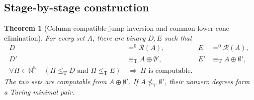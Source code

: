 \documentclass[11pt,a4paper]{article}
\newcommand{\N}{\mathbb N}
\newcommand{\Baire}{\N^{\N}}
\newcommand{\leT}{\leq_{\mathrm T}}
\newcommand{\eqT}{\equiv_{\mathrm T}}
\newcommand{\nleT}{\nleq_{\mathrm T}}
\newcommand{\az}{\mathrel{=^{0}}}
\newcommand{\R}{\mathcal R}
\newtheorem{theorem}{Theorem}[section]
\theoremstyle{definition}\newtheorem{definition}[theorem]{Definition}
\theoremstyle{remark}\newtheorem{remark}[theorem]{Remark}
\begin{document}
\subsection{Stage-by-stage construction}
\begin{theorem}[Column-compatible jump inversion and common-lower-cone elimination]\label{thm:pair}
For every set $A$, there are binary $D,E$ such that
\begin{align}
 D&\az\R(A),&E&\az\R(A),\label{eq:pair-density}\\
 D'&\eqT A\oplus\emptyset',&E'&\eqT A\oplus\emptyset',\label{eq:pair-jumps}\\
 \forall H\in\Baire\quad
 (H\leT D\text{ and }H\leT E)&\ \Longrightarrow\ H\text{ is computable}.
 \label{eq:pair-lower}
\end{align}
The two sets are computable from $A\oplus\emptyset'$. If $A\nleT\emptyset'$, their nonzero degrees form a Turing minimal pair.
\end{theorem}
\end{document}
